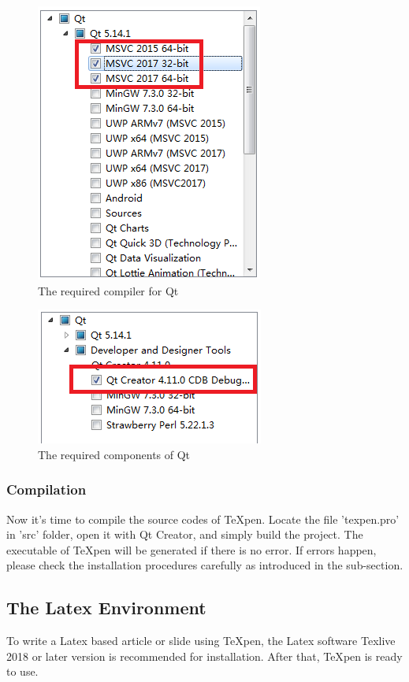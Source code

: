 \documentclass[12pt,a4paper]{article}
\begin{document}
\begin{figure}[hbt]
\begin{center}
\includegraphics[scale=0.8]{figs/qt1.png}
\end{center}
\caption{The required compiler for Qt}
\label{qt1}
\end{figure}

\begin{figure}[hbt]
\begin{center}
\includegraphics[scale=0.8]{figs/qt2.png}
\end{center}
\caption{The required components of Qt}
\label{qt2}
\end{figure}

\subsubsection{Compilation}
Now it's time to compile the source codes of {\TeX}pen. Locate the file 'texpen.pro' in 'src' folder, open it with Qt Creator, and simply build the project. The executable of {\TeX}pen will be generated if there is no error. If errors happen, please check the installation procedures carefully as introduced in the sub-section.

\subsection{The Latex Environment}
To write a Latex based article or slide using {\TeX}pen, the Latex software Texlive 2018 or later version is recommended for installation. After that, {\TeX}pen is ready to use. 
\end{document}
